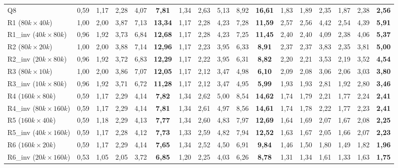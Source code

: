 \begin{table}[H]
{\begin{tabular}{@{}l|ccccc|ccccc|cccccc@{}}
Q8              & 0{,}59 & 1{,}17 & 2{,}28 & 4{,}07 & \textbf{7{,}81} & 1{,}34 & 2{,}63 & 5{,}13 & 8{,}92 & \textbf{16{,}61} & 1{,}83 & 1{,}89 & 2{,}35 & 1{,}87 & 2{,}38 & \textbf{2{,}56} \\
R1 ($80k \times 40k$)   & 1{,}00 & 2{,}00 & 3{,}87 & 7{,}13 & \textbf{13{,}34} & 1{,}17 & 2{,}28 & 4{,}23 & 7{,}28 & \textbf{11{,}59} & 2{,}57 & 2{,}56 & 4{,}42 & 2{,}54 & 4{,}39 & \textbf{5{,}91} \\
R1\_inv ($40k \times 80k$) & 0{,}96 & 1{,}92 & 3{,}73 & 6{,}84 & \textbf{12{,}68} & 1{,}17 & 2{,}28 & 4{,}23 & 7{,}25 & \textbf{11{,}45} & 2{,}40 & 2{,}40 & 4{,}09 & 2{,}38 & 4{,}06 & \textbf{5{,}37} \\
R2 ($80k \times 20k$)   & 1{,}00 & 2{,}00 & 3{,}88 & 7{,}14 & \textbf{12{,}96} & 1{,}17 & 2{,}23 & 3{,}95 & 6{,}33 & \textbf{8{,}91} & 2{,}37 & 2{,}37 & 3{,}83 & 2{,}35 & 3{,}81 & \textbf{5{,}00} \\
R2\_inv ($20k \times 80k$) & 0{,}96 & 1{,}92 & 3{,}72 & 6{,}83 & \textbf{12{,}29} & 1{,}17 & 2{,}22 & 3{,}95 & 6{,}31 & \textbf{8{,}82} & 2{,}20 & 2{,}21 & 3{,}53 & 2{,}19 & 3{,}52 & \textbf{4{,}54} \\
R3 ($80k \times 10k$)   & 1{,}00 & 2{,}00 & 3{,}86 & 7{,}07 & \textbf{12{,}05} & 1{,}17 & 2{,}12 & 3{,}47 & 4{,}98 & \textbf{6{,}10} & 2{,}09 & 2{,}08 & 3{,}06 & 2{,}06 & 3{,}03 & \textbf{3{,}80} \\
R3\_inv ($10k \times 80k$) & 0{,}96 & 1{,}92 & 3{,}71 & 6{,}72 & \textbf{11{,}28} & 1{,}17 & 2{,}12 & 3{,}47 & 4{,}95 & \textbf{5{,}99} & 1{,}93 & 1{,}93 & 2{,}81 & 1{,}92 & 2{,}80 & \textbf{3{,}46} \\
R4 ($160k \times 80k$)  & 0{,}59 & 1{,}17 & 2{,}29 & 4{,}14 & \textbf{7{,}82} & 1{,}34 & 2{,}62 & 5{,}00 & 8{,}54 & \textbf{14{,}62} & 1{,}74 & 1{,}79 & 2{,}21 & 1{,}77 & 2{,}24 & \textbf{2{,}41} \\
R4\_inv ($80k \times 160k$)& 0{,}59 & 1{,}17 & 2{,}29 & 4{,}14 & \textbf{7{,}81} & 1{,}34 & 2{,}61 & 4{,}97 & 8{,}56 & \textbf{14{,}61} & 1{,}74 & 1{,}78 & 2{,}22 & 1{,}77 & 2{,}23 & \textbf{2{,}41} \\
R5 ($160k \times 40k$)  & 0{,}59 & 1{,}18 & 2{,}29 & 4{,}13 & \textbf{7{,}77} & 1{,}34 & 2{,}60 & 4{,}83 & 7{,}97 & \textbf{12{,}69} & 1{,}64 & 1{,}69 & 2{,}07 & 1{,}67 & 2{,}08 & \textbf{2{,}25} \\
R5\_inv ($40k \times 160k$)& 0{,}59 & 1{,}17 & 2{,}28 & 4{,}12 & \textbf{7{,}73} & 1{,}33 & 2{,}59 & 4{,}82 & 7{,}94 & \textbf{12{,}52} & 1{,}63 & 1{,}67 & 2{,}05 & 1{,}66 & 2{,}07 & \textbf{2{,}23} \\
R6 ($160k \times 20k$)  & 0{,}59 & 1{,}17 & 2{,}29 & 4{,}14 & \textbf{7{,}65} & 1{,}34 & 2{,}52 & 4{,}50 & 6{,}91 & \textbf{9{,}84} & 1{,}46 & 1{,}50 & 1{,}80 & 1{,}49 & 1{,}82 & \textbf{1{,}96} \\
R6\_inv ($20k \times 160k$)& 0{,}53 & 1{,}05 & 2{,}05 & 3{,}72 & \textbf{6{,}85} & 1{,}20 & 2{,}25 & 4{,}03 & 6{,}26 & \textbf{8{,}78} & 1{,}31 & 1{,}34 & 1{,}61 & 1{,}33 & 1{,}63 & \textbf{1{,}75} \\ \bottomrule
\end{tabular}%
}
\end{table}

